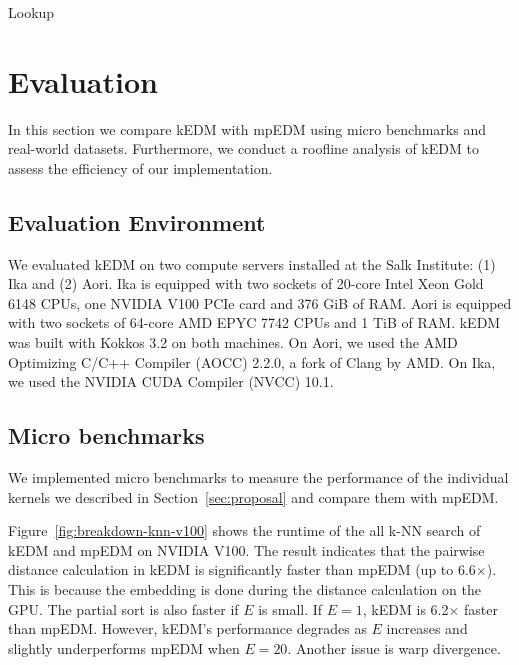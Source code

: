 \documentclass[sigconf]{acmart}
\begin{document}
\begin{algorithm}
    \SetAlgoLined
    \DontPrintSemicolon
    \caption{Lookup}%
    \label{alg:lookup}
\end{algorithm}

\section{Evaluation}\label{sec:evaluation}

In this section we compare kEDM with mpEDM using micro benchmarks and
real-world datasets. Furthermore, we conduct a roofline analysis of kEDM to
assess the efficiency of our implementation.

\subsection{Evaluation Environment}


We evaluated kEDM on two compute servers installed at the Salk Institute: (1)
Ika and (2) Aori. Ika is equipped with two sockets of 20-core Intel Xeon Gold
6148 CPUs, one NVIDIA V100 PCIe card and 376 GiB of RAM\@. Aori is equipped with
two sockets of 64-core AMD EPYC 7742 CPUs and 1 TiB of RAM\@. kEDM was built
with Kokkos 3.2 on both machines. On Aori, we used the AMD Optimizing C/C++
Compiler (AOCC) 2.2.0, a fork of Clang by AMD. On Ika, we used the NVIDIA CUDA
Compiler (NVCC) 10.1.

\subsection{Micro benchmarks}

We implemented micro benchmarks to measure the performance of the individual
kernels we described in Section~\ref{sec:proposal} and compare them with
mpEDM\@.

Figure~\ref{fig:breakdown-knn-v100} shows the runtime of the all k-NN search
of kEDM and mpEDM on NVIDIA V100. The result indicates that the pairwise
distance calculation in kEDM is significantly faster than mpEDM (up to
6.6$\times$). This is because the embedding is done during the distance
calculation on the GPU\@. The partial sort is also faster if $E$ is small. If
$E=1$, kEDM is 6.2$\times$ faster than mpEDM\@. However, kEDM's performance
degrades as $E$ increases and slightly underperforms mpEDM when $E=20$.
Another issue is warp divergence.
\end{document}
